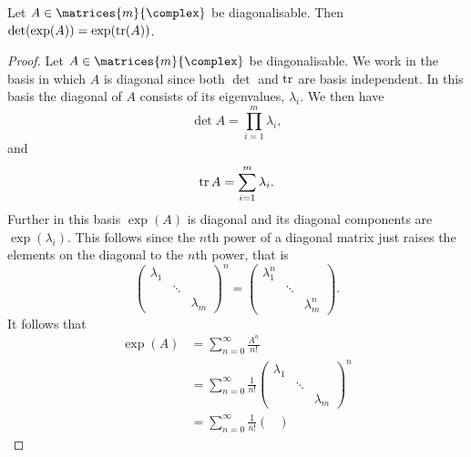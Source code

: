 \begin{lma}{}{}
    Let \(A \in \matrices{m}{\complex}\) be diagonalisable.
    Then \(\det(\exp(A)) = \exp(\operatorname{tr}(A))\).
    \begin{proof}
        Let \(A \in \matrices{m}{\complex}\) be diagonalisable.
        We work in the basis in which \(A\) is diagonal since both \(\det\) and \(\operatorname{tr}\) are basis independent.
        In this basis the diagonal of \(A\) consists of its eigenvalues, \(\lambda_i\).
        We then have
        \begin{equation}
            \det A = \prod_{i = 1}^{m} \lambda_i,
        \end{equation}
        and
        \begin{equation}
            \operatorname{tr} A = \sum_{i = 1}^{m} \lambda_i.
        \end{equation}
        Further in this basis \(\exp(A)\) is diagonal and its diagonal components are \(\exp(\lambda_i)\).
        This follows since the \(n\)th power of a diagonal matrix just raises the elements on the diagonal to the \(n\)th power, that is
        \begin{equation}
            \begin{pmatrix}
                \lambda_1 &&\\
                &\ddots &\\
                && \lambda_m
            \end{pmatrix}
            ^n = 
            \begin{pmatrix}
                \lambda_1^n &&\\
                &\ddots &\\
                && \lambda_m^n
            \end{pmatrix}
            .
        \end{equation}
        It follows that
        \begingroup
        \allowdisplaybreaks
        \begin{align}
            \exp(A) &= \sum_{n = 0}^{\infty} \frac{A^n}{n!}\\
            &= \sum_{n = 0}^{\infty} \frac{1}{n!} 
            \begin{pmatrix}
                \lambda_1 && \\
                & \ddots & \\
                && \lambda_m
            \end{pmatrix}
            ^n\\
            &= \sum_{n = 0}^{\infty} \frac{1}{n!}
            \begin{pmatrix}

\end{pmatrix}
\end{align}
\end{proof}
\end{lma}
